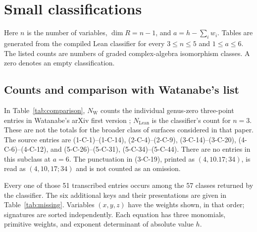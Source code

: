 \clearpage
\appendix
\section{Small classifications}
\label{app:tables}

Here $n$ is the number of variables, $\dim R=n-1$, and $a=h-\sum_iw_i$. Tables are generated from the compiled Lean classifier for every $3\leq n\leq5$ and $1\leq a\leq6$. The listed counts are numbers of graded complex-algebra isomorphism classes. A zero denotes an empty classification.

\subsection{Counts and comparison with Watanabe's list}
\begin{table}[htbp]
\centering

\caption{Complete class counts for small $n$ and $a$.}
\label{tab:counts}
\end{table}

In Table~\ref{tab:comparison}, $N_{\mathrm W}$ counts the individual genus-zero three-point entries in Watanabe's arXiv first version \cite{Watanabe}; $N_{\mathrm{Lean}}$ is the classifier's count for $n=3$. These are not the totals for the broader class of surfaces considered in that paper. The source entries are (1-C-1)--(1-C-14), (2-C-4)--(2-C-9), (3-C-14)--(3-C-20), (4-C-6)--(4-C-12), and (5-C-26)--(5-C-31), (5-C-34)--(5-C-44). There are no entries in this subclass at $a=6$. The punctuation in (3-C-19), printed as $(4,10.17;34)$, is read as $(4,10,17;34)$ and is not counted as an omission.

\begin{table}[htbp]
\centering

\caption{Comparison with the specified three-point entries in \texttt{arXiv:1401.0789v1}.}
\label{tab:comparison}
\end{table}

Every one of those 51 transcribed entries occurs among the 57 classes returned by the classifier. The six additional keys and their presentations are given in Table~\ref{tab:missing}. Variables $(x,y,z)$ have the weights shown, in that order; signatures are sorted independently. Each equation has three monomials, primitive weights, and exponent determinant of absolute value $h$.

\begin{table}[htbp]
\centering\small

\caption{The six weight systems absent from the compared list.}
\label{tab:missing}
\end{table}

